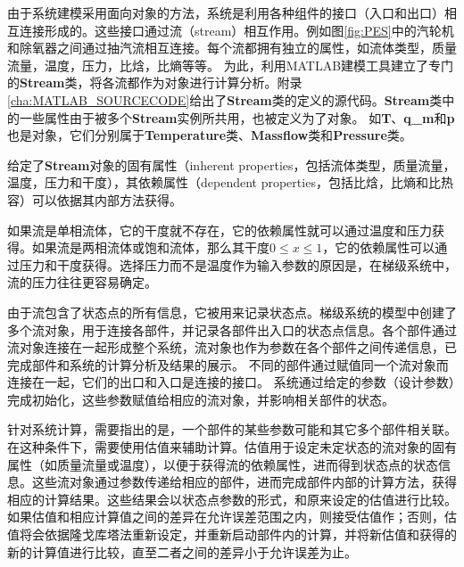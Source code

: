 由于系统建模采用面向对象的方法，系统是利用各种组件的接口（入口和出口）相互连接形成的。这些接口通过流（stream）相互作用。例如图\ref{fig:PES}中的汽轮机和除氧器之间通过抽汽流相互连接。每个流都拥有独立的属性，如流体类型，质量流量，温度，压力，比焓，比熵等等。
为此，利用MATLAB建模工具建立了专门的\textbf{Stream}类，将各流都作为对象进行计算分析。附录\ref{cha:MATLAB_SOURCECODE}给出了\textbf{Stream}类的定义的源代码。\textbf{Stream}类中的一些属性由于被多个\textbf{Stream}实例所共用，也被定义为了对象。
如\textbf{T}、\textbf{q\_m}和\textbf{p}也是对象，它们分别属于\textbf{Temperature}类、\textbf{Massflow}类和\textbf{Pressure}类。

给定了\textbf{Stream}对象的固有属性（inherent properties，包括流体类型，质量流量，温度，压力和干度），其依赖属性（dependent properties，包括比焓，比熵和比热容）可以依据其内部方法获得。

如果流是单相流体，它的干度就不存在，它的依赖属性就可以通过温度和压力获得。如果流是两相流体或饱和流体，那么其干度$0 \leqslant x \leqslant 1$，它的依赖属性可以通过压力和干度获得。选择压力而不是温度作为输入参数的原因是，在梯级系统中，流的压力往往更容易确定。

由于流包含了状态点的所有信息，它被用来记录状态点。梯级系统的模型中创建了多个流对象，用于连接各部件，并记录各部件出入口的状态点信息。各个部件通过流对象连接在一起形成整个系统，流对象也作为参数在各个部件之间传递信息，已完成部件和系统的计算分析及结果的展示。
不同的部件通过赋值同一个流对象而连接在一起，它们的出口和入口是连接的接口。
系统通过给定的参数（设计参数）完成初始化，这些参数赋值给相应的流对象，并影响相关部件的状态。

针对系统计算，需要指出的是，一个部件的某些参数可能和其它多个部件相关联。
在这种条件下，需要使用估值来辅助计算。估值用于设定未定状态的流对象的固有属性（如质量流量或温度），以便于获得流的依赖属性，进而得到状态点的状态信息。这些流对象通过参数传递给相应的部件，进而完成部件内部的计算方法，获得相应的计算结果。这些结果会以状态点参数的形式，和原来设定的估值进行比较。如果估值和相应计算值之间的差异在允许误差范围之内，则接受估值作；否则，估值将会依据隆戈库塔法重新设定，并重新启动部件内的计算，并将新估值和获得的新的计算值进行比较，直至二者之间的差异小于允许误差为止。


